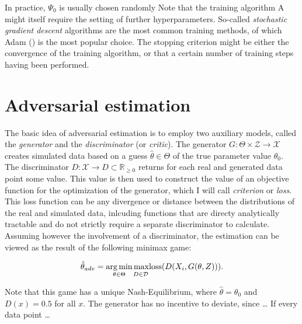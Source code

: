In practice, $\Psi_0$ is usually chosen randomly
Note that the training algorithm A might itself require the setting of further hyperparameters.
So-called \textit{stochastic gradient descent} algorithms are the most common training methods, of which Adam (\cite{diederik2014adam}) is the most popular choice. %
The stopping criterion might be either the convergence of the training algorithm, or that a certain number of training steps having been performed.

\section{Adversarial estimation}
\label{sec:adversarial_estimation}

The basic idea of adversarial estimation is to employ two auxiliary models, called the \textit{generator} and the \textit{discriminator} (or \textit{critic}).
The generator $G : \Theta \times \mathcal{Z} \rightarrow \mathcal{X}$ creates simulated data based on a guess $\hat{\theta} \in \Theta$ of the true parameter value $\theta_0$.
The discriminator $D : \mathcal{X} \rightarrow D \subset \mathbb{R}_{\geq 0}$ returns for each real and generated data point some value.
This value is then used to construct the value of an objective function for the optimization of the generator, which I will call \textit{criterion} or \textit{loss}.
This loss function can be any divergence or distance between the distributions of the real and simulated data, inlcuding functions that are directy analytically tractable and do not strictly require a separate discriminator to calculate. %
Assuming however the involvement of a discriminator, the estimation can be viewed as the result of the following minimax game:

\begin{equation}
    \label{eq:adversarial_estimator}
        \hat{\theta}_{adv} = \underset{\theta \in \Theta}{\arg\min}\underset{D\in\mathcal{D}}{\vphantom{g}\max} \text{loss}(D(X_i, G(\theta, Z))).
\end{equation}

Note that this game has a unique Nash-Equilibrium, where $\hat{\theta} = \theta_0$ and $D(x) = 0.5$ for all $x$.
The generator has no incentive to deviate, since \dots %
If every data point \dots

